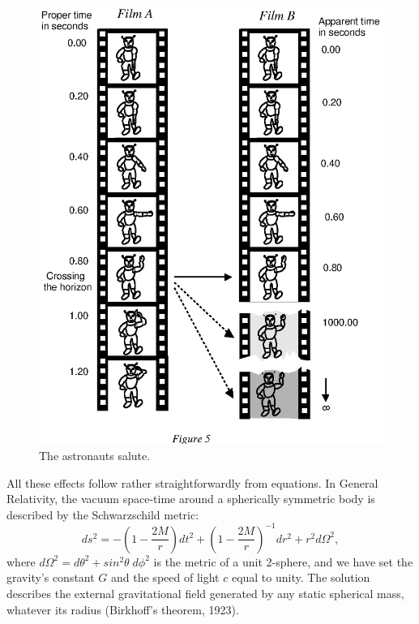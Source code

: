 \documentclass{lamuphys}
\begin{document}
\begin{figure}[tb]
  \begin{center}
    \leavevmode
    \includegraphics{spaceship.ps}
    \caption{The astronauts salute.}
  \end{center}
\end{figure}

All these effects follow rather straightforwardly from equations.
In General Relativity, the vacuum space-time around a spherically symmetric body
is described by the Schwarzschild metric: 
\begin{equation}
ds^2 = - \left(1- \frac{2M}{r}\right)dt^2 
+ \left(1-\frac{2M}{r}\right)^{-1}dr^2 + r^2 d\Omega^2,
\end{equation}
where $d\Omega^2 = d\theta^2 + sin^2\theta \;d\phi^2$ is the metric of a unit
2-sphere, and we have set the gravity's constant $G$ and the speed of light $c$
equal to unity. The solution describes the external gravitational field
generated by any static spherical mass, whatever its radius (Birkhoff's theorem,
1923). 
\end{document}
